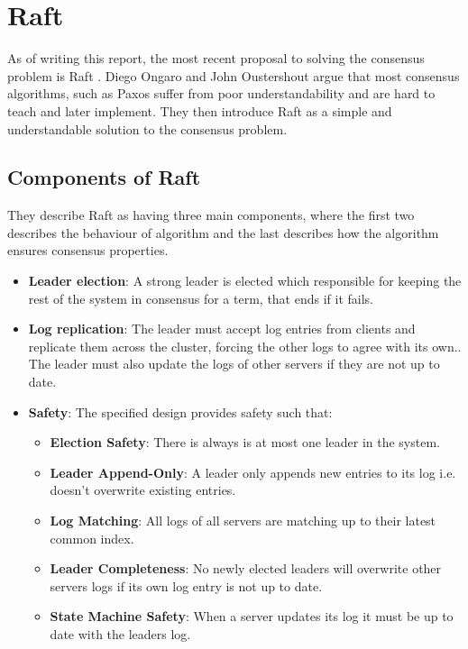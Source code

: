 \section{Raft}
\label{sec:raft}
As of writing this report, the most recent proposal to solving the consensus problem is Raft \cite{Raft}. Diego Ongaro and John Oustershout argue that most consensus algorithms, such as Paxos \cite{Paxos} suffer from poor understandability and are hard to teach and later implement. They then introduce Raft as a simple and understandable solution to the consensus problem. 
\subsection{Components of Raft}
They describe Raft as having three main components, where the first two describes the behaviour of algorithm and the last describes how the algorithm ensures consensus properties.
\begin{itemize}
\item \textbf{Leader election}: A strong leader is elected which responsible for keeping the rest of the system in consensus for a term, that ends if it fails.
\item \textbf{Log replication}: The leader must accept log entries from clients and replicate them across the cluster, forcing the other logs to agree with its own.\cite{Raft}. The leader must also update the logs of other servers if they are not up to date.
\item \textbf{Safety}: The specified design provides safety such that\cite{Raft}: 
    \begin{itemize}
    \item \textbf{Election Safety}: There is always is at most one leader in the system.
    \item \textbf{Leader Append-Only}: A leader only appends new entries to its log i.e. doesn't overwrite existing entries.
    \item \textbf{Log Matching}: All logs of all servers are matching up to their latest common index.
    \item \textbf{Leader Completeness}: No newly elected leaders will overwrite other servers logs if its own log entry is not up to date.
    \item \textbf{State Machine Safety}: When a server updates its log it must be up to date with the leaders log.
    \end{itemize}
\end{itemize}
